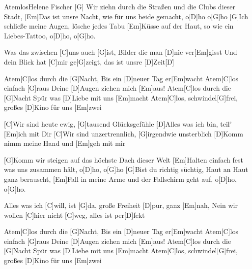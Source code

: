 \documentclass[../main.tex]{subfiles}
\begin{document}
\begin{song}[4]{Atemlos}{Helene Fischer}{}       
[G] \hh [Am] \hh [Em] \hh
[G]Wir ziehn durch die Straßen und die Clubs dieser Stadt,
[Em]Das ist unsre Nacht, wie für uns beide gemacht, o[D]ho o[G]ho
[G]Ich schließe meine Augen, lösche jedes Tabu
[Em]Küsse auf der Haut, so wie ein Liebes-Tattoo, o[D]ho, o[G]ho.

Was das zwischen [C]uns auch [G]ist, Bilder die man [D]nie ver[Em]gisst
Und dein Blick hat [C]mir ge[G]zeigt, das ist unsre [D]Zeit[D]{\h}

Atem[C]los durch die [G]Nacht,
Bis ein [D]neuer Tag er[Em]wacht
Atem[C]los einfach [G]raus
Deine [D]Augen ziehen mich [Em]aus!
Atem[C]los durch die [G]Nacht
Spür was [D]Liebe mit uns [Em]macht
Atem[C]los, schwindel[G]frei,
großes [D]Kino für uns [Em]zwei

[C]Wir sind heute ewig, [G]tausend Glücksgefühle
[D]Alles was ich bin, teil’ [Em]ich mit Dir
[C]Wir sind unzertrennlich, [G]irgendwie unsterblich
[D]Komm nimm meine Hand und [Em]geh mit mir

[G]Komm wir steigen auf das höchste Dach dieser Welt
[Em]Halten einfach fest was uns zusammen hält, o[D]ho, o[G]ho
[G]Bist du richtig süchtig, Haut an Haut ganz berauscht,
[Em]Fall in meine Arme und der Fallschirm geht auf, o[D]ho, o[G]ho.

Alles was ich [C]will, ist [G]da, große Freiheit [D]pur, ganz [Em]nah,
Nein wir wollen [C]hier nicht [G]weg, alles ist per[D]fekt

Atem[C]los durch die [G]Nacht,
Bis ein [D]neuer Tag er[Em]wacht
Atem[C]los einfach [G]raus
Deine [D]Augen ziehen mich [Em]aus!
Atem[C]los durch die [G]Nacht
Spür was [D]Liebe mit uns [Em]macht
Atem[C]los, schwindel[G]frei,
großes [D]Kino für uns [Em]zwei
\end{song}
\end{document}
